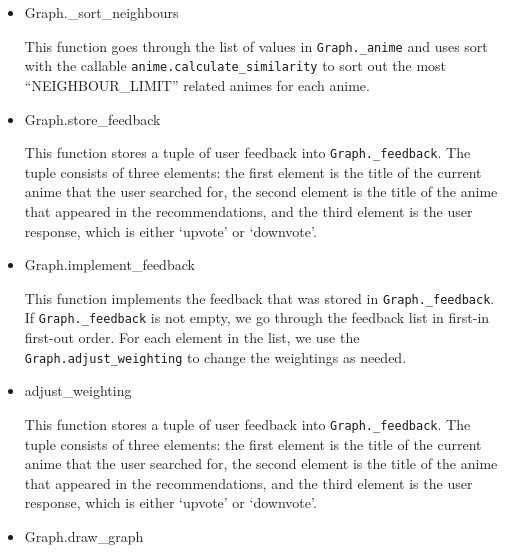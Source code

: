 \documentclass[12pt]{article}
\begin{document}
\begin{enumerate}
\begin{text}
\begin{itemize}
\begin{itemize}
        \item Graph.\_sort\_neighbours
        
            This function goes through the list of values in \texttt{Graph.\_anime} and uses sort with the callable \texttt{anime.calculate\_similarity} to sort out the most ``NEIGHBOUR\_LIMIT'' related animes for each anime.
            
        \item Graph.store\_feedback
        
            This function stores a tuple of user feedback into \texttt{Graph.\_feedback}. The tuple consists of three elements: the first element is the title of the current anime that the user searched for, the second element is the title of the anime that appeared in the recommendations, and the third element is the user response, which is either `upvote' or `downvote'.
        
        \item Graph.implement\_feedback
        
            This function implements the feedback that was stored in \texttt{Graph.\_feedback}. If \texttt{Graph.\_feedback} is not empty, we go through the feedback list in first-in first-out order. For each element in the list, we use the \texttt{Graph.adjust\_weighting} to change the weightings as needed.
        
        \item adjust\_weighting
        
            This function stores a tuple of user feedback into \texttt{Graph.\_feedback}. The tuple consists of three elements: the first element is the title of the current anime that the user searched for, the second element is the title of the anime that appeared in the recommendations, and the third element is the user response, which is either `upvote' or `downvote'.
        
        \item Graph.draw\_graph
        

\end{itemize}
\end{itemize}
\end{text}
\end{enumerate}
\end{document}
